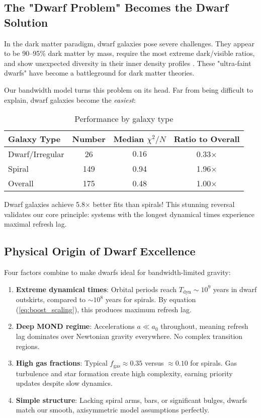 \documentclass[twocolumn,prd,amsmath,amssymb,aps,superscriptaddress,nofootinbib]{revtex4-2}
\newcommand{\chisqN}{\chi^2/N}
\newcommand{\azero}{a_0}
\begin{document}
\subsection{The "Dwarf Problem" Becomes the Dwarf Solution}

In the dark matter paradigm, dwarf galaxies pose severe challenges. They appear to be 90--95\% dark matter by mass, require the most extreme dark/visible ratios, and show unexpected diversity in their inner density profiles \cite{Oman2015}. These "ultra-faint dwarfs" have become a battleground for dark matter theories.

Our bandwidth model turns this problem on its head. Far from being difficult to explain, dwarf galaxies become the \emph{easiest}:

\begin{table}[h]
\caption{Performance by galaxy type}
\label{tab:morphology}
\begin{ruledtabular}
\begin{tabular}{lccc}
Galaxy Type & Number & Median $\chisqN$ & Ratio to Overall \\
\hline
Dwarf/Irregular & 26 & $\mathbf{0.16}$ & 0.33$\times$ \\
Spiral & 149 & 0.94 & 1.96$\times$ \\
Overall & 175 & 0.48 & 1.00$\times$ \\
\end{tabular}
\end{ruledtabular}
\end{table}

Dwarf galaxies achieve 5.8$\times$ better fits than spirals! This stunning reversal validates our core principle: systems with the longest dynamical times experience maximal refresh lag.

\subsection{Physical Origin of Dwarf Excellence}

Four factors combine to make dwarfs ideal for bandwidth-limited gravity:

\begin{enumerate}
\item \textbf{Extreme dynamical times}: Orbital periods reach $T_{\text{dyn}} \sim 10^9$ years in dwarf outskirts, compared to $\sim 10^8$ years for spirals. By equation (\ref{eq:boost_scaling}), this produces maximum refresh lag.

\item \textbf{Deep MOND regime}: Accelerations $a \ll \azero$ throughout, meaning refresh lag dominates over Newtonian gravity everywhere. No complex transition regions.

\item \textbf{High gas fractions}: Typical $f_{\text{gas}} \approx 0.35$ versus $\approx 0.10$ for spirals. Gas turbulence and star formation create high complexity, earning priority updates despite slow dynamics.

\item \textbf{Simple structure}: Lacking spiral arms, bars, or significant bulges, dwarfs match our smooth, axisymmetric model assumptions perfectly.
\end{enumerate}
\end{document}
